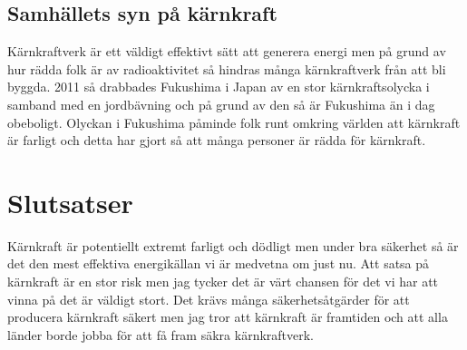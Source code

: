\documentclass[11p]{article}
\begin{document}
    \subsection{Samhällets syn på kärnkraft}
    Kärnkraftverk är ett väldigt effektivt sätt att generera energi men på grund av hur rädda folk är av radioaktivitet så hindras många kärnkraftverk från att bli byggda.
    2011 så drabbades Fukushima i Japan av en stor kärnkraftsolycka i samband med en jordbävning och på grund av den så är Fukushima än i dag obeboligt.
    Olyckan i Fukushima påminde folk runt omkring världen att kärnkraft är farligt och detta har gjort så att många personer är rädda för kärnkraft.



    \section{Slutsatser}
    Kärnkraft är potentiellt extremt farligt och dödligt men under bra säkerhet så är det den mest effektiva energikällan vi är medvetna om just nu.
    Att satsa på kärnkraft är en stor risk men jag tycker det är värt chansen för det vi har att vinna på det är väldigt stort.
    Det krävs många säkerhetsåtgärder för att producera kärnkraft säkert men jag tror att kärnkraft är framtiden och att alla länder borde jobba för att få fram säkra kärnkraftverk.









    \printbibliography
\end{document}
